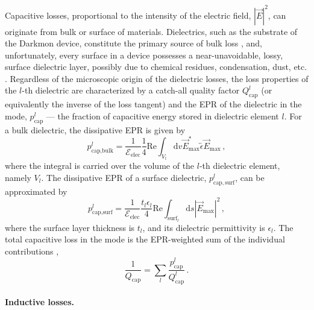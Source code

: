 Capacitive losses, proportional to the intensity of the electric field,
$\left|\vec{E}\right|^{2}$, can originate from bulk or surface of
materials. Dielectrics, such as the substrate of the Darkmon device,
constitute the primary source of bulk loss \citep{Martinis2014,Dial2016,Kamal2016-anneal},
and, unfortunately, every surface in a device possesses a near-unavoidable,
lossy, surface dielectric layer, possibly due to chemical residues,
condensation, dust, etc. \citep{Martinis2014,Wang2015}. Regardless
of the microscopic origin of the dielectric losses, the loss properties
of the $l$-th dielectric are characterized by a catch-all quality
factor $Q_{\text{cap}}^{l}$ (or equivalently the inverse of the loss
tangent) and the EPR of the dielectric in the mode, $p_{\mathrm{cap}}^{l}$
— the fraction of capacitive energy stored in dielectric element $l$.
For a bulk dielectric, the dissipative EPR is given by 
\begin{equation}
p_{\text{cap,bulk}}^{l}=\frac{1}{\mathcal{E}_{\mathrm{elec}}}\frac{1}{4}\mathrm{Re}\int_{V_{l}}\mathrm{d}v\vec{E}_{\text{max}}^{*}\overleftrightarrow{\epsilon}\vec{E}_{\text{max}}\,,
\end{equation}
where the integral is carried over the volume of the $l$-th dielectric
element, namely $V_{l}$. The dissipative EPR of a surface dielectric,
$p_{\mathrm{cap,surf}}^{l}$, can be approximated by 
\begin{equation}
p_{\text{cap,surf}}^{l}=\frac{1}{\mathcal{E}_{\mathrm{elec}}}\frac{t_{l}\epsilon_{l}}{4}\mathrm{Re}\int_{\text{surf}_{l}}\mathrm{d}s\left|\vec{E}_{\text{max}}\right|^{2}\,,
\end{equation}
where the surface layer thickness is $t_{l}$, and its dielectric
permittivity is $\epsilon_{l}$. The total capacitive loss in the
mode is the EPR-weighted sum of the individual contributions \citep{Zmuidzinas2012,Geerlings2013},
\begin{equation}
\frac{1}{Q_{\text{cap}}}=\sum_{l}{\frac{p_{\text{cap}}^{l}}{Q_{\text{cap}}^{l}}}\,.\label{eq:cap-loss}
\end{equation}


\paragraph{Inductive losses.}

